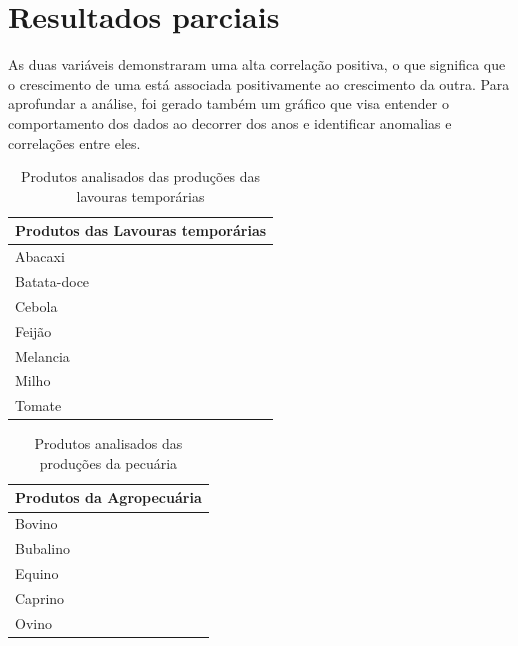 
\section{Resultados parciais}



As duas variáveis demonstraram uma alta correlação positiva, o que significa que o crescimento de uma está associada positivamente ao crescimento da outra. Para aprofundar a análise, foi gerado também um gráfico que visa entender o comportamento dos dados ao decorrer dos anos e identificar anomalias e correlações entre eles.
\begin{center}
    \begin{table}[!htb]
        \centering
        \begin{tabular}{|p{}|}
        \hline
        \textbf{Produtos das Lavouras temporárias} \\ \hline
           Abacaxi \\ 
            \hline
           Batata-doce \\ 
            \hline
           Cebola \\ 
            \hline
           Feijão \\
            \hline
           Melancia \\
            \hline
           Milho \\
            \hline
           Tomate \\
            \hline  
            \end{tabular}
        \caption{Produtos analisados das produções das lavouras temporárias}
        \label{tab:produto_analisados-lavtemp}
    \end{table}
\end{center}


\begin{center}
    \begin{table}[!htb]
        \centering
        \begin{tabular}{|p{}|}
        \hline
        \textbf{Produtos da Agropecuária} \\ 
            \hline  
            Bovino \\
            \hline  
            Bubalino \\
            \hline  
            Equino \\
            \hline  
            Caprino \\
            \hline  
            Ovino \\
            \hline  
            \end{tabular}
        \caption{Produtos analisados das produções da pecuária}
        \label{tab:produto_analisados-pecuaria}
    \end{table}
\end{center}


